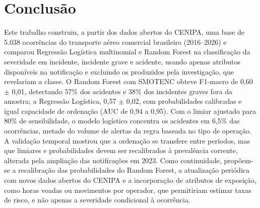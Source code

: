 \documentclass[12pt]{article}
\begin{document}
\FloatBarrier
\section{Conclusão}
\label{sec:conclusao}

Este trabalho construiu, a partir dos dados abertos do CENIPA, uma base de 5.038 ocorrências do transporte aéreo comercial brasileiro (2016--2026) e comparou Regressão Logística multinomial e Random Forest na classificação da severidade em incidente, incidente grave e acidente, usando apenas atributos disponíveis na notificação e excluindo os produzidos pela investigação, que revelariam a classe. O Random Forest com SMOTENC obteve F1-macro de 0,60 $\pm$ 0,01, detectando 57\% dos acidentes e 38\% dos incidentes graves fora da amostra; a Regressão Logística, 0,57 $\pm$ 0,02, com probabilidades calibradas e igual capacidade de ordenação (AUC de 0,94 a 0,95). Com o limiar ajustado para 80\% de sensibilidade, o modelo logístico concentra os acidentes em 6,5\% das ocorrências, metade do volume de alertas da regra baseada no tipo de operação. A validação temporal mostrou que a ordenação se transfere entre períodos, mas que limiares e probabilidades devem ser recalibrados à prevalência corrente, alterada pela ampliação das notificações em 2023. Como continuidade, propõem-se a recalibração das probabilidades do Random Forest, a atualização periódica com novos dados abertos do CENIPA e a incorporação de atributos de exposição, como horas voadas ou movimentos por operador, que permitiriam estimar taxas de risco, e não apenas a severidade condicional à ocorrência.



\end{document}
